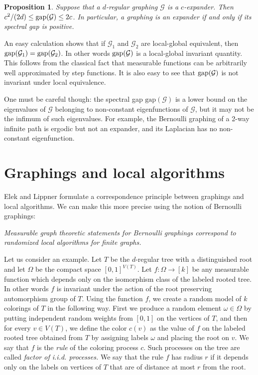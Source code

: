 \documentclass{article}
\newtheorem{proposition}[theorem]{Proposition}
\def\GG{\mathcal{G}}\def\HH{\mathcal{H}}\def\II{\mathcal{I}}
\begin{document}
\begin{proposition}\label{PROP:EXPAND1}
Suppose that a $d$-regular graphing $\GG$ is a $c$-expander. Then
$c^2/(2d)\le \text{\rm gap}(\GG)\le 2c$. In particular, a graphing is
an expander if and only if its spectral gap is positive.
\end{proposition}

An easy calculation shows that if $\GG_1$ and $\GG_2$ are
local-global equivalent, then ${\rm gap}(\GG_1)={\rm gap}(\GG_2)$. In
other words ${\rm gap}(\GG)$ is a local-global invariant quantity.
This follows from the classical fact that measurable functions can be
arbitrarily well approximated by step functions. {It is also easy to
see that ${\rm gap}(\GG)$ is not invariant under local equivalence.}

One must be careful though: the spectral gap $\text{gap}(\GG)$ is a
lower bound on the eigenvalues of $\GG$ belonging to non-constant
eigenfunctions of $\GG$, but it may not be the infimum of such
eigenvalues. For example, the Bernoulli graphing of a 2-way infinite
path is ergodic but not an expander, and its Laplacian has no
non-constant eigenfunction.

\section{Graphings and local algorithms\label{sec:Alg}}

{}
Elek and Lippner \cite{ElLi} formulate a correspondence {principle}
between graphings and local algorithms. We can make this more precise
using the notion of Bernoulli graphings:

\medskip

\noindent\emph{Measurable graph theoretic statements for Bernoulli
graphings correspond to randomized local algorithms for finite
graphs.}

\medskip

Let us {consider} an example. Let $T$ be the $d$-regular tree with a
distinguished root and let $\Omega$ be the compact space
$[0,1]^{V(T)}$. Let $f:\Omega\rightarrow [k]$ be any measurable
function which depends only on the isomorphism class of the labeled
rooted tree. In other words $f$ is invariant under the action of the
root preserving automorphism group of $T$. Using the function $f$, we
create a random model of $k$ colorings of $T$ in the following way.
First we produce a random element $\omega\in\Omega$ by putting
independent random {weights} from $[0,1]$ on the vertices of $T$, and
then for every $v\in V(T)$, we define the color $c(v)$ as the value
of $f$ on the labeled rooted tree obtained from $T$ by assigning
labels $\omega$ and placing the root on $v$. We say that $f$ is the
\emph{rule} of the coloring process $c$. Such processes on the tree
are called \emph{factor of i.i.d. processes.} We say that the rule
$f$ has radius $r$ if it depends only on the labels on vertices of
$T$ that are of distance at most $r$ from the root.
\end{document}
